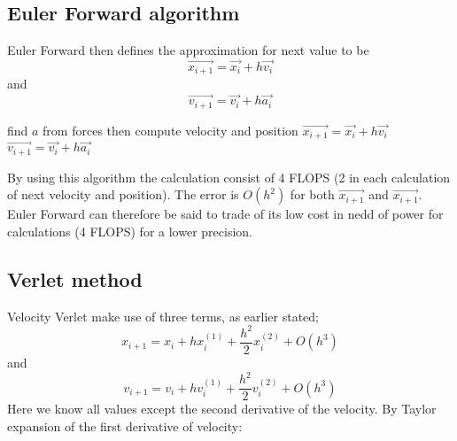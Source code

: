 \documentclass[twoside,twocolumn]{article}
\begin{document}
\subsection{Euler Forward algorithm}
Euler Forward then defines the approximation for next value to be
\begin{equation}
\vec{  x_{i+1}} = \vec{x_{i}} + h \vec{v_i}
\end{equation}
and
\begin{equation}
\vec{  v_{i+1}} = \vec{v_{i}} + h \vec{a_i}
\end{equation}

\begin{algorithmic}[H]

\State find $a$ from forces
\State then compute velocity and position
\State $\vec{  x_{i+1}} = \vec{x_{i}} + h \vec{v_i}$
\State $\vec{  v_{i+1}} = \vec{v_{i}} + h \vec{a_i}$
\EndFor
\end{algorithmic}
By using this algorithm the calculation consist of 4 FLOPS (2 in each calculation of next velocity and position). The error is $O(h^2)$ for both $ \vec{  x_{i+1}}$ and $\vec{  x_{i+1}}$. Euler Forward can therefore be said to trade of its low cost in nedd of power for calculations (4 FLOPS) for a lower precision.

\subsection{Verlet method}
Velocity Verlet make use of three terms, as earlier stated;
\begin{equation}\label{eq:verlet1}
 x_{i+1} =x_{i}+ h x_{i}^{(1)} +\frac{h^2}{2} x_{i}^{(2)} + O(h^3)
\end{equation}
and
\begin{equation} \label{eq:verlet2}
v_{i+1} =v_{i}+ h v_{i}^{(1)}+\frac{h^2}{2} v_{i}^{(2)} + O(h^3)
\end{equation}
Here we know all values except the second derivative of the velocity. By Taylor expansion of the first derivative of velocity:
\end{document}
